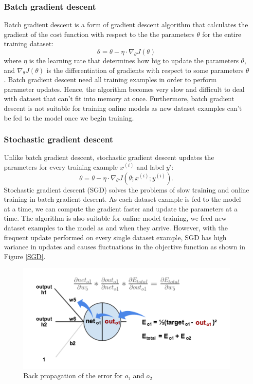 \documentclass[master]{thesis-uestc}
\begin{document}
\subsubsection{Batch gradient descent}
Batch gradient descent is a form of gradient descent algorithm that calculates the gradient of the cost function with respect to the the parameters $\theta$ for the entire training dataset:
\begin{equation}
    \theta = \theta - \eta \cdot \nabla_\theta J(\theta)
\end{equation}
where $\eta$ is the learning rate that determines how big to update the parameters $\theta$, and $\nabla_\theta J(\theta)$ is the differentiation of gradients with respect to some parameters $\theta$. Batch gradient descent need all training examples in order to perform parameter updates. Hence, the algorithm becomes very slow and difficult to deal with dataset that can't fit into memory at once. Furthermore, batch gradient descent is not suitable for training online models as new dataset examples can't be fed to the model once we begin training. 

\subsubsection{Stochastic gradient descent}
Unlike batch gradient descent, stochastic gradient descent updates the parameters for every training example $x^{(i)}$ and label $y^{i}$:
\begin{equation}
    \theta = \theta - \eta \cdot\nabla_\theta J(\theta;x^{(i)};y^{(i)}).
\end{equation}
Stochastic gradient descent (SGD) solves the problems of slow training and online training in batch gradient descent. As each dataset example is fed to the model at a time, we can compute the gradient faster and update the parameters at a time. The algorithm is also suitable for online model training, we feed new dataset examples to the model as and when they arrive. However, with the frequent update performed on every single dataset example, SGD has high variance in updates and causes fluctuations in the objective function as shown in Figure \ref{SGD}.

\begin{figure}[ht]
\includegraphics[width=5in]{pic/output_1_backprop-4.png}
\caption{Back propagation of the error for $o_1$ and $o_2$}
\label{output_1_backprop}
\end{figure}
\end{document}
